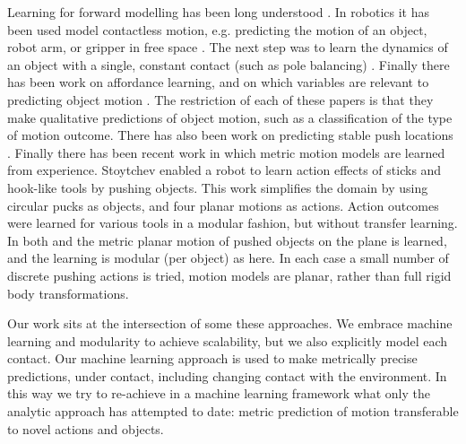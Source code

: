Learning for forward modelling has been long understood \citep{JordanJacobs90, JordanRumelhart92}. In robotics it has been used model contactless motion, e.g. predicting the motion of an object, robot arm, or gripper in free space \citep{Ting06,Boots14,dearden2005learning}. The next step was to learn the dynamics of an object with a single, constant contact (such as pole balancing) \citep{Schaal97,SchaalAtkeson97}. Finally there has been work on affordance learning, and on which variables are relevant to predicting object motion \citep{montesano08,moldovan12,hermans11,fitzpatrick_learning_2003,ridge2010self,kroemer2014}. The restriction of each of these papers is that they make qualitative predictions of object motion, such as a classification of the type of motion outcome. There has also been work on predicting stable push locations \citep{hermans13}. Finally there has been recent work in which metric motion models are learned from experience. Stoytchev \citep{Stoytchev_affordances_2008} enabled a robot to learn action effects of sticks and hook-like tools by pushing objects. This work simplifies the domain by using circular pucks as objects, and four planar motions as actions. Action outcomes were learned for various tools in a modular fashion, but without transfer learning.  In both \citep{mericli2014} and \cite{scholz2010combining} the metric planar motion of pushed objects on the plane is learned, and the learning is modular (per object) as here. In each case a small number of discrete pushing actions is tried, motion models are planar, rather than full rigid body transformations.

Our work sits at the intersection of some these approaches. We embrace machine learning and modularity to achieve scalability, but we also explicitly model each contact. Our machine learning approach is used to make metrically precise predictions, under contact, including changing contact with the environment. In this way we try to re-achieve in a machine learning framework what only the analytic approach has attempted to date: metric prediction of motion transferable to novel actions and objects. 